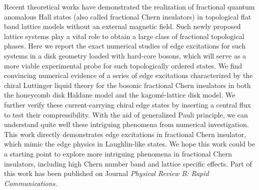 \begin{englishabstract}
Recent theoretical works have demonstrated the realization of fractional quantum anomalous Hall states (also called fractional Chern insulators) in topological flat band lattice models without an external magnetic field. Such newly proposed lattice systems play a vital role to obtain a large class of fractional topological phases. Here we report the exact numerical studies of edge excitations for such systems in a disk geometry loaded with hard-core bosons, which will serve as a more viable experimental probe for such topologically ordered states. We find convincing numerical evidence of a series of edge excitations characterized by the chiral Luttinger liquid theory for the bosonic fractional Chern insulators in both the honeycomb disk Haldane model and the kagom\'{e}-lattice disk model. We further verify these current-carrying chiral edge states by inserting a central flux to test their compressibility. With the aid of generalized Pauli principle, we can understand quite well these intriguing phenomena from numerical investigation. This work directly demonstrates edge excitations in fractional Chern insulator, which mimic the edge physics in Laughlin-like states. We hope this work could be a starting point to explore more intriguing phenomena in fractional Chern insulators, including high Chern number band and lattice specific effects. Part of this work has been published on Journal \emph{Physical Review B: Rapid Communications.}

\end{englishabstract}

